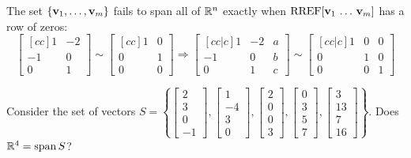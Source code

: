 \begin{applicationActivities}
\begin{fact}
  The set \(\{\mathbf v_1,\dots,\mathbf v_m\}\) fails to span all of \(\mathbb{R}^n\)
  exactly when \(\operatorname{RREF}[\mathbf v_1\,\dots\,\mathbf v_m]\) has a row of zeros:
  \[\begin{bmatrix}[cc]1&-2\\-1&0\\0&1\end{bmatrix}\sim
  \begin{bmatrix}[cc]1&0\\0&1\\0&0\end{bmatrix}\Rightarrow
  \begin{bmatrix}[cc|c]1&-2&a\\-1&0&b\\0&1&c\end{bmatrix}\sim
  \begin{bmatrix}[cc|c]1&0&0\\0&1&0\\0&0&1\end{bmatrix}\]
\end{fact}

\begin{activity}{5}
  Consider the set of vectors \(S=\left\{
  \begin{bmatrix}2\\3\\0\\-1\end{bmatrix},
  \begin{bmatrix}1\\-4\\3\\0\end{bmatrix},
  \begin{bmatrix}2\\0\\0\\3\end{bmatrix},
  \begin{bmatrix}0\\3\\5\\7\end{bmatrix},
  \begin{bmatrix}3\\13\\7\\16\end{bmatrix}
  \right\}
  \).
  Does
  \(\mathbb{R}^4=\operatorname{span} S\)?
\end{activity}


\end{applicationActivities}
